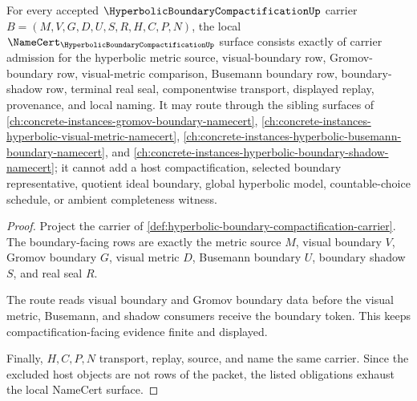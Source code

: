 \begin{theorem}
\label{thm:hyperbolic-boundary-compactification-namecert-obligations}
For every accepted $\HyperbolicBoundaryCompactificationUp$ carrier $B=(M,V,G,D,U,S,R,H,C,P,N)$, the local $\NameCert_{\HyperbolicBoundaryCompactificationUp}$ surface consists exactly of carrier admission for the hyperbolic metric source, visual-boundary row, Gromov-boundary row, visual-metric comparison, Busemann boundary row, boundary-shadow row, terminal real seal, componentwise transport, displayed replay, provenance, and local naming. It may route through the sibling surfaces of \autoref{ch:concrete-instances-gromov-boundary-namecert}, \autoref{ch:concrete-instances-hyperbolic-visual-metric-namecert}, \autoref{ch:concrete-instances-hyperbolic-busemann-boundary-namecert}, and \autoref{ch:concrete-instances-hyperbolic-boundary-shadow-namecert}; it cannot add a host compactification, selected boundary representative, quotient ideal boundary, global hyperbolic model, countable-choice schedule, or ambient completeness witness.
\end{theorem}
\begin{proof}
Project the carrier of \autoref{def:hyperbolic-boundary-compactification-carrier}. The boundary-facing rows are exactly the metric source $M$, visual boundary $V$, Gromov boundary $G$, visual metric $D$, Busemann boundary $U$, boundary shadow $S$, and real seal $R$.

The route reads visual boundary and Gromov boundary data before the visual metric, Busemann, and shadow consumers receive the boundary token. This keeps compactification-facing evidence finite and displayed.

Finally, $H,C,P,N$ transport, replay, source, and name the same carrier. Since the excluded host objects are not rows of the packet, the listed obligations exhaust the local NameCert surface.
\end{proof}

